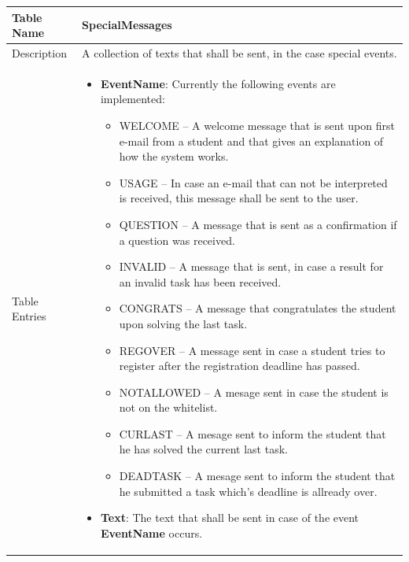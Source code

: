 \begin{tabular}{|p{3cm}|p{10cm}|}
\hline
Table Name & SpecialMessages \\
\hline
Description & A collection of texts that shall be sent, in the case special events. \\
\hline
Table Entries & \begin{itemize}
    \item {\bf EventName}: Currently the following events are implemented:
        \begin{itemize}
        \item WELCOME -- A welcome message that is sent upon first e-mail from a student and
                that gives an explanation of how the system works.
        \item USAGE -- In case an e-mail that can not be interpreted is received, this message
                shall be sent to the user.
        \item QUESTION -- A message that is sent as a confirmation if a question was received.
        \item INVALID -- A message that is sent, in case a result for an invalid task has
                been received.
        \item CONGRATS -- A message that congratulates the student upon solving the last task.
        \item REGOVER -- A message sent in case a student tries to register after the registration 
                deadline has passed.
        \item NOTALLOWED -- A mesage sent in case the student is not on the whitelist.
        \item CURLAST -- A mesage sent to inform the student that he has solved the current last task.
        \item DEADTASK -- A mesage sent to inform the student that he submitted a task which's deadline is allready over.
            \end{itemize}
        \item {\bf Text}: The text that shall be sent in case of the event {\bf EventName} occurs.
        \end{itemize} \\
\hline
\end{tabular}

